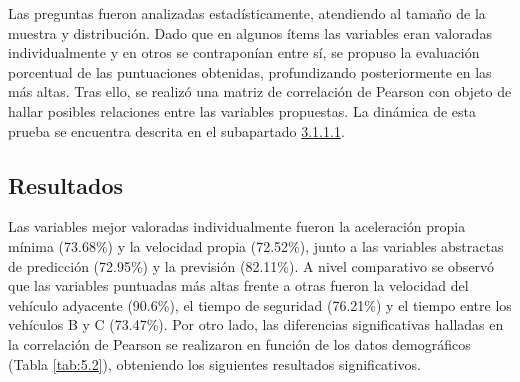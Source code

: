 Las preguntas fueron analizadas estadísticamente, atendiendo al tamaño de la muestra y distribución. Dado que en algunos ítems las variables eran valoradas individualmente y en otros se contraponían entre sí, se propuso la evaluación porcentual de las puntuaciones obtenidas, profundizando posteriormente en las más altas. Tras ello, se realizó una matriz de correlación de Pearson con objeto de hallar posibles relaciones entre las variables propuestas. La dinámica de esta prueba se encuentra descrita en el subapartado \hyperref[3111]{3.1.1.1}.

\subsection{Resultados }\label{512}
Las variables mejor valoradas individualmente fueron la aceleración propia mínima (73.68\%) y la velocidad propia (72.52\%), junto a las variables abstractas de predicción (72.95\%) y la previsión (82.11\%). A nivel comparativo se observó que las variables puntuadas más altas frente a otras fueron la velocidad del vehículo adyacente (90.6\%), el tiempo de seguridad (76.21\%) y el tiempo entre los vehículos B y C (73.47\%). Por otro lado, las diferencias significativas halladas en la correlación de Pearson se realizaron en función de los datos demográficos (Tabla \ref{tab:5.2}), obteniendo los siguientes resultados significativos.

